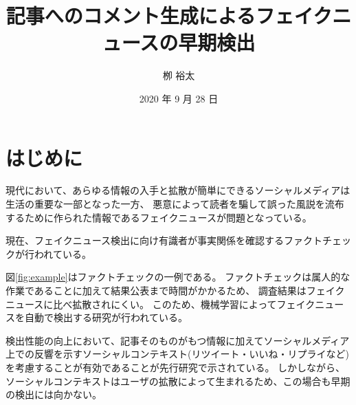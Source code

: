 \documentclass[twocolumn, a4paper, uplatex]{UECIEresume}
\title{記事へのコメント生成によるフェイクニュースの早期検出}
\date{2020 年 9 月 28 日}
\affiliation{情報学専攻 メディア情報学 プログラム}
\author{栁 裕太}
\begin{document}
\maketitle

\section{はじめに}

現代において、あらゆる情報の入手と拡散が簡単にできるソーシャルメディアは生活の重要な一部となった一方、
悪意によって読者を騙して誤った風説を流布するために作られた情報であるフェイクニュースが問題となっている。

現在、フェイクニュース検出に向け有識者が事実関係を確認するファクトチェックが行われている。


図\ref{fig:example}はファクトチェックの一例である\cite{gillin_2017}。
ファクトチェックは属人的な作業であることに加えて結果公表まで時間がかかるため、
調査結果はフェイクニュースに比べ拡散されにくい。
このため、機械学習によってフェイクニュースを自動で検出する研究が行われている。

検出性能の向上において、記事そのものがもつ情報に加えてソーシャルメディア上での反響を示すソーシャルコンテキスト(リツイート・いいね・リプライなど)
を考慮することが有効であることが先行研究で示されている\cite{Guo:2018:RDH:3269206.3271709}。
しかしながら、ソーシャルコンテキストはユーザの拡散によって生まれるため、この場合も早期の検出には向かない。
\end{document}
